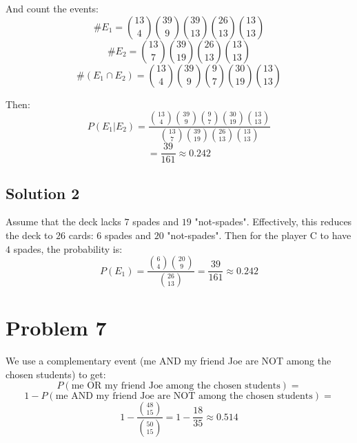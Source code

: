\documentclass{article}
\begin{document}
And count the events:
\begin{equation*}
    \#E_1 = \binom{13}{4}\binom{39}{9}\binom{39}{13}\binom{26}{13}\binom{13}{13}
\end{equation*}
\begin{equation*}
    \#E_2 = \binom{13}{7}\binom{39}{19}\binom{26}{13}\binom{13}{13}
\end{equation*}
\begin{equation*}
    \#(E_1 \cap E_2) = \binom{13}{4}\binom{39}{9}\binom{9}{7}\binom{30}{19}\binom{13}{13}
\end{equation*}

Then:
\begin{equation*}
    P(E_1 | E_2) = \frac{\binom{13}{4}\binom{39}{9}\binom{9}{7}\binom{30}{19}\binom{13}{13}}{\binom{13}{7}\binom{39}{19}\binom{26}{13}\binom{13}{13}}
\end{equation*}
\begin{equation*}
    = \frac{39}{161} \approx 0.242
\end{equation*}



\subsection*{Solution 2}
Assume that the deck lacks \(7\) spades and \(19\) "not-spades". Effectively, this reduces the deck to \(26\) cards: \(6\) spades and \(20\) "not-spades".
Then for the player C to have \(4\) spades, the probability is:
\begin{equation*}
    P(E_1) = \frac{\binom{6}{4} \binom{20}{9}}{\binom{26}{13}} = \frac{39}{161} \approx 0.242
\end{equation*}

\section*{Problem 7}
We use a complementary event (me AND my friend Joe are NOT among the chosen students) to get:
\begin{equation*}
    P(\mbox{me OR my friend Joe among the chosen students}) = 
\end{equation*}
\begin{equation*}
    1 - P(\mbox{me AND my friend Joe are NOT among the chosen students}) =
\end{equation*}
\begin{equation*}
    1 - \frac{\binom{48}{15}}{\binom{50}{15}} = 1 - \frac{18}{35} \approx 0.514
\end{equation*}
\end{document}
